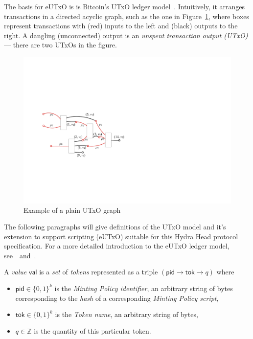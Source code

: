 The basis for eUTxO is is Bitcoin's UTxO ledger
model~\cite{formal-model-of-bitcoin-transactions,Zahnentferner18-UTxO}.
Intuitively, it arranges transactions in a directed acyclic graph, such as the
one in Figure~\ref{fig:utxo-graph}, where boxes represent transactions with
(red) inputs to the left and (black) outputs to the right. A dangling
(unconnected) output is an \emph{unspent transaction output (UTxO)} --- there
are two UTxOs in the figure.

\begin{figure}[h]
  \centering
 \includegraphics[width=\textwidth/2]{figures/utxo-graph.pdf}
 \caption{Example of a plain UTxO graph}
  \label{fig:utxo-graph}
\end{figure}

The following paragraphs will give definitions of the UTxO model and it's
extension to support scripting (eUTxO) suitable for this Hydra Head protocol
specification. For a more detailed introduction to the eUTxO ledger model,
see~\cite{eutxo}~and~\cite{eutxo-2}.

\begin{definition}[Values]

A \emph{value} $\mathsf{val}$ is a \emph{set} of \emph{tokens} represented as a triple $(\mathsf{pid} \rightarrow \mathsf{tok} \rightarrow q)$ where
\begin{itemize}
    \item $\mathsf{pid} \in \{0,1\}^k$ is the \emph{Minting Policy identifier}, an arbitrary string of bytes corresponding to the \emph{hash} of a corresponding \emph{Minting Policy script},
    \item $\mathsf{tok} \in \{0,1\}^k$ is the \emph{Token name}, an arbitrary string of bytes,
    \item $q \in \mathbb{Z}$ is the quantity of this particular token.
\end{itemize}

\end{definition}


